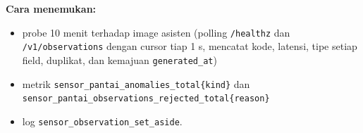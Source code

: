 \textbf{Cara menemukan:}


\begin{itemize}
\item probe 10 menit terhadap image asisten (polling \texttt{/\allowbreak{}healthz} dan \texttt{/\allowbreak{}v1/\allowbreak{}observations} dengan cursor tiap 1 s, mencatat kode, latensi, tipe setiap field, duplikat, dan kemajuan \texttt{generated\_\allowbreak{}at})
\item metrik \texttt{sensor\_\allowbreak{}pantai\_\allowbreak{}anomalies\_\allowbreak{}total\{kind\}} dan \texttt{sensor\_\allowbreak{}pantai\_\allowbreak{}observations\_\allowbreak{}rejected\_\allowbreak{}total\{reason\}}
\item log \texttt{sensor\_\allowbreak{}observation\_\allowbreak{}set\_\allowbreak{}aside}.
\end{itemize}

